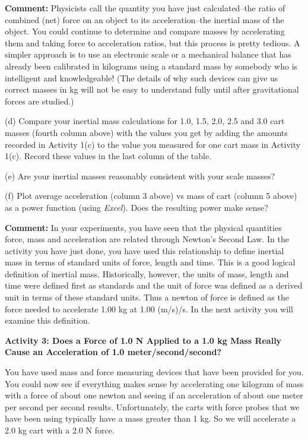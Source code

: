 \textbf{Comment:} Physicists call the quantity you have just calculated--the
ratio of combined (net) force on an object to its acceleration--the inertial
mass of the object. You could continue to determine and compare masses by accelerating them and taking force to acceleration ratios, but this process is pretty tedious.
A simpler approach is to use an electronic scale or a mechanical balance that
has already been calibrated in kilograms using a standard mass by somebody who
is intelligent and knowledgeable! (The details of why such devices can give
us correct masses in kg will not be easy to understand fully until after gravitational forces are studied.) 

(d) Compare your inertial mass calculations for 1.0, 1.5, 2.0, 2.5 and 3.0 cart
masses (fourth column above) with the values you get by adding the amounts recorded in Activity 1(c) to the value you measured for one cart mass in Activity 1(c). Record these values in the last column of the table.

(e) Are your inertial masses reasonably consistent with your scale masses?
\answerspace{10mm}

(f) Plot average acceleration (column 3 above) vs mass of cart (column 5 above) as a power function (using \textit{Excel}). Does the resulting power make sense?
\answerspace{5mm}

\textbf{Comment:} In your experiments, you have seen that the physical quantities
force, mass and acceleration are related through Newton's Second Law. In the
activity you have just done, you have used this relationship to define inertial
mass in terms of standard units of force, length and time. This is a good logical
definition of inertial mass. Historically, however, the units of mass, length
and time were defined first as standards and the unit of force was defined as
a derived unit in terms of these standard units. Thus a newton of force is defined
as the force needed to accelerate 1.00 kg at 1.00 (m/s)/s. In the next activity
you will examine this definition. 

\pagebreak[2]
\textbf{Activity 3: Does a Force of 1.0 N Applied to a 1.0 kg Mass Really Cause
an Acceleration of 1.0 meter/second/second?} 

You have used mass and force measuring devices that have been provided for you.
You could now see if everything makes sense by accelerating one kilogram of
mass with a force of about one newton and seeing if an acceleration of about
one meter per second per second results. Unfortunately, the carts with force
probes that we have been using typically have a mass greater than 1 kg. So we
will accelerate a 2.0 kg cart with a 2.0 N force.

